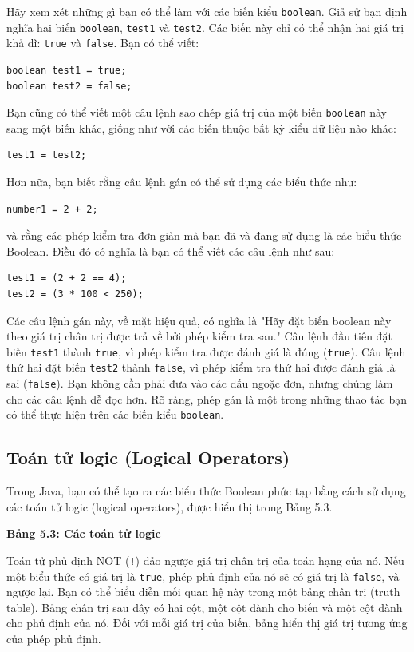 Hãy xem xét những gì bạn có thể làm với các biến kiểu \texttt{boolean}. Giả sử bạn định nghĩa hai biến \texttt{boolean}, \texttt{test1} và \texttt{test2}. Các biến này chỉ có thể nhận hai giá trị khả dĩ: \texttt{true} và \texttt{false}. Bạn có thể viết:
\begin{verbatim}
boolean test1 = true;
boolean test2 = false;
\end{verbatim}


Bạn cũng có thể viết một câu lệnh sao chép giá trị của một biến \texttt{boolean} này sang một biến khác, giống như với các biến thuộc bất kỳ kiểu dữ liệu nào khác:
\begin{verbatim}
test1 = test2;
\end{verbatim}


Hơn nữa, bạn biết rằng câu lệnh gán có thể sử dụng các biểu thức như:
\begin{verbatim}
number1 = 2 + 2;
\end{verbatim}

và rằng các phép kiểm tra đơn giản mà bạn đã và đang sử dụng là các biểu thức Boolean. Điều đó có nghĩa là bạn có thể viết các câu lệnh như sau:
\begin{verbatim}
test1 = (2 + 2 == 4);
test2 = (3 * 100 < 250);
\end{verbatim}


Các câu lệnh gán này, về mặt hiệu quả, có nghĩa là "Hãy đặt biến boolean này theo giá trị chân trị được trả về bởi phép kiểm tra sau." Câu lệnh đầu tiên đặt biến \texttt{test1} thành \texttt{true}, vì phép kiểm tra được đánh giá là đúng (\texttt{true}). Câu lệnh thứ hai đặt biến \texttt{test2} thành \texttt{false}, vì phép kiểm tra thứ hai được đánh giá là sai (\texttt{false}). Bạn không cần phải đưa vào các dấu ngoặc đơn, nhưng chúng làm cho các câu lệnh dễ đọc hơn. Rõ ràng, phép gán là một trong những thao tác bạn có thể thực hiện trên các biến kiểu \texttt{boolean}.

\subsection*{Toán tử logic (Logical Operators)}

Trong Java, bạn có thể tạo ra các biểu thức Boolean phức tạp bằng cách sử dụng các toán tử logic (logical operators), được hiển thị trong Bảng 5.3.

\noindent \textbf{Bảng 5.3: Các toán tử logic}

Toán tử phủ định NOT (\texttt{!}) đảo ngược giá trị chân trị của toán hạng của nó. Nếu một biểu thức có giá trị là \texttt{true}, phép phủ định của nó sẽ có giá trị là \texttt{false}, và ngược lại. Bạn có thể biểu diễn mối quan hệ này trong một bảng chân trị (truth table). Bảng chân trị sau đây có hai cột, một cột dành cho biến và một cột dành cho phủ định của nó. Đối với mỗi giá trị của biến, bảng hiển thị giá trị tương ứng của phép phủ định.

